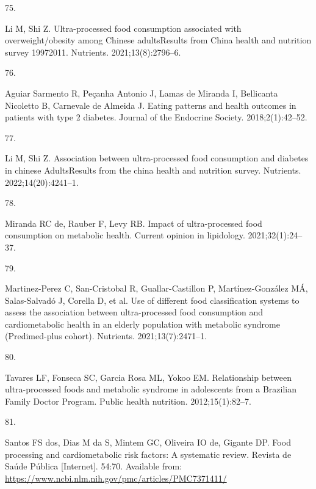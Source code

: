 \documentclass[
]{article}
\newlength{\cslhangindent}
\newlength{\csllabelwidth}
\newlength{\cslentryspacingunit} %
\newenvironment{CSLReferences}[2] %
 {%
  \setlength{\parindent}{0pt}
  \ifodd #1
  \let\oldpar\par
  \def\par{\hangindent=\cslhangindent\oldpar}
  \fi
  \setlength{\parskip}{#2\cslentryspacingunit}
 }%
 {}
\newcommand{\CSLLeftMargin}[1]{\parbox[t]{\csllabelwidth}{#1}}
\newcommand{\CSLRightInline}[1]{\parbox[t]{\linewidth - \csllabelwidth}{#1}\break}
\begin{document}
\begin{CSLReferences}{0}{0}
\leavevmode{}%
\CSLLeftMargin{75. }%
\CSLRightInline{Li M, Shi Z. Ultra-processed food consumption associated
with overweight/obesity among Chinese adults{\textemdash}Results from
China health and nutrition survey 1997{\textendash}2011. Nutrients.
2021;13(8):2796--6. }

\leavevmode{}%
\CSLLeftMargin{76. }%
\CSLRightInline{Aguiar Sarmento R, Peçanha Antonio J, Lamas de Miranda
I, Bellicanta Nicoletto B, Carnevale de Almeida J. Eating patterns and
health outcomes in patients with type 2 diabetes. Journal of the
Endocrine Society. 2018;2(1):42--52. }

\leavevmode{}%
\CSLLeftMargin{77. }%
\CSLRightInline{Li M, Shi Z. Association between ultra-processed food
consumption and diabetes in chinese Adults{\textemdash}Results from the
china health and nutrition survey. Nutrients. 2022;14(20):4241--1. }

\leavevmode{}%
\CSLLeftMargin{78. }%
\CSLRightInline{Miranda RC de, Rauber F, Levy RB. Impact of
ultra-processed food consumption on metabolic health. Current opinion in
lipidology. 2021;32(1):24--37. }

\leavevmode{}%
\CSLLeftMargin{79. }%
\CSLRightInline{Martinez-Perez C, San-Cristobal R, Guallar-Castillon P,
Martínez-González MÁ, Salas-Salvadó J, Corella D, et al. Use of
different food classification systems to assess the association between
ultra-processed food consumption and cardiometabolic health in an
elderly population with metabolic syndrome (Predimed-plus cohort).
Nutrients. 2021;13(7):2471--1. }

\leavevmode{}%
\CSLLeftMargin{80. }%
\CSLRightInline{Tavares LF, Fonseca SC, Garcia Rosa ML, Yokoo EM.
Relationship between ultra-processed foods and metabolic syndrome in
adolescents from a {Brazilian Family Doctor Program}. Public health
nutrition. 2012;15(1):82--7. }

\leavevmode{}%
\CSLLeftMargin{81. }%
\CSLRightInline{Santos FS dos, Dias M da S, Mintem GC, Oliveira IO de,
Gigante DP. Food processing and cardiometabolic risk factors: A
systematic review. Revista de Saúde Pública {[}Internet{]}. 54:70.
Available from:
\url{https://www.ncbi.nlm.nih.gov/pmc/articles/PMC7371411/}}


\end{CSLReferences}
\end{document}
